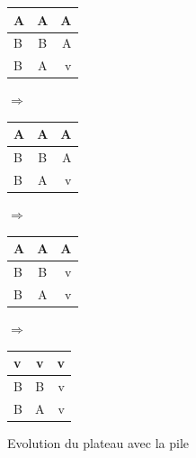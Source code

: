 \documentclass[a4paper,11pt]{article}
\begin{document}
\begin{figure}[!h]
\begin{center}
\begin{tabular}{ | l | c | r | }
	\hline
	A & A & A \\ 
	\hline
	B & B & A \\ 
	\hline
	B & A & \cellcolor{blue!25}v \\
	\hline
\end{tabular}
\hspace{0.1cm}
{\Huge
\begin{math}
\Rightarrow
\end{math}}
\hspace{0.1cm}
\begin{tabular}{ | l | c | r | }
	\hline
	A & A & A \\ 
	\hline
	B & B & \cellcolor{red!25}A \\ 
	\hline
	B & A & \cellcolor{blue!25}v \\
	\hline
\end{tabular}
\hspace{0.1cm}
{\Huge
\begin{math}
\Rightarrow
\end{math}}
\hspace{0.1cm}
\begin{tabular}{ | l | c | r | }
	A & A &\cellcolor{red!25}A \\ 
	\hline
	B & B & \cellcolor{green!25}v \\ 
	\hline
	B & A & \cellcolor{blue!25}v \\
	\hline
\end{tabular}
\hspace{0.1cm}
{\Huge
\begin{math}
\Rightarrow
\end{math}}
\hspace{0.1cm}
\begin{tabular}{ | l | c | r | }
	\cellcolor{blue!25}v & \cellcolor{blue!25}v &\cellcolor{blue!25}v \\ 
	\hline
	B & B & \cellcolor{blue!25}v \\ 
	\hline
	B & \cellcolor{red!25}A & \cellcolor{blue!25}v \\
	\hline
\end{tabular}
\end{center}
\caption{Evolution du plateau avec la pile}

\end{figure}
\end{document}
